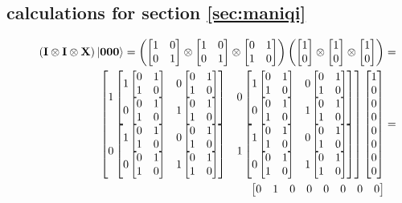 \subsection{calculations for section \ref{sec:maniqi}}\label{app:maniqi}
\begin{figure}[H]
    \centering
    \begin{align*}
        \left(\qti\otimes\qti\otimes\qtx\right)\ket{\qtz\qtz\qtz}=\left(\qi\otimes\qi\otimes\qx\right)\left(\qz\otimes\qz\otimes\qz\right)&= \\
        \begin{bmatrix}
            1
            \begin{bmatrix}
                1 \qx & 0 \qx\\
                0 \qx & 1 \qx\\
            \end{bmatrix}
            & 0
            \begin{bmatrix}
                1 \qx & 0 \qx\\
                0 \qx & 1 \qx\\
            \end{bmatrix}\\
            0 
            \begin{bmatrix}
                1 \qx & 0 \qx\\
                0 \qx & 1 \qx\\
            \end{bmatrix}
            & 1
            \begin{bmatrix}
                1 \qx & 0 \qx\\
                0 \qx & 1 \qx\\
            \end{bmatrix}\\ 
        \end{bmatrix}
        \begin{bmatrix}
            1\\
            0\\
            0\\
            0\\
            0\\
            0\\
            0\\
            0
        \end{bmatrix}
        &=\\
        \begin{bmatrix}
            0 & 1 & 0 & 0 & 0 & 0 & 0 & 0\\

\end{bmatrix}
\end{align*}
\end{figure}
